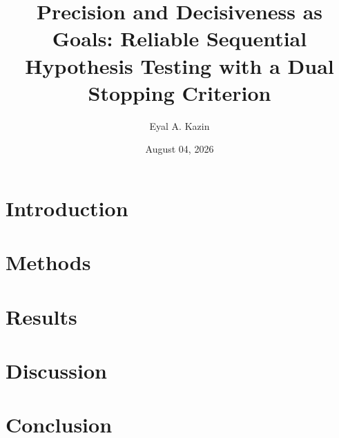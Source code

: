\documentclass{article}
\title{Precision and Decisiveness as Goals: Reliable Sequential Hypothesis Testing with a Dual Stopping Criterion}
\date{August 04, 2026}
\author{Eyal A. Kazin}
\begin{document}
\maketitle




\section{Introduction}




\section{Methods}\label{sec:methods}



\section{Results}\label{sec:results}



\section{Discussion}\label{sec:discussion}


\section{Conclusion}\label{sec:conclusion}


\appendix















\end{document}
